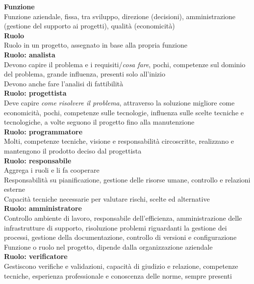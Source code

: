 \documentclass{article}
\begin{document}
		\textbf{Funzione}\\
		Funzione aziendale, fissa, tra sviluppo, direzione (decisioni), amministrazione (gestione del supporto ai progetti), qualità (economicità)\\
		
		\textbf{Ruolo}\\
		Ruolo in un progetto, assegnato in base alla propria funzione\\
		
		\textbf{Ruolo: analista}\\
		Devono capire il problema e i requisiti/\textit{cosa fare}, pochi, competenze sul dominio del problema, grande influenza, presenti solo all'inizio\\
		Devono anche fare l'analisi di fattibilità\\
		
		\textbf{Ruolo: progettista}\\
		Deve capire \textit{come risolvere il problema}, attraverso la soluzione migliore come economicità, pochi, competenze sulle tecnologie, influenza sulle scelte tecniche e tecnologiche, a volte seguono il progetto fino alla manutenzione\\
		
		\textbf{Ruolo: programmatore}\\
		Molti, competenze tecniche, visione e responsabilità circoscritte, realizzano e mantengono il prodotto deciso dal progettista\\
		
		\textbf{Ruolo: responsabile}\\
		Aggrega i ruoli e li fa cooperare\\
		Responsabilità su pianificazione, gestione delle risorse umane, controllo e relazioni esterne\\
		Capacità tecniche necessarie per valutare rischi, scelte ed alternative\\
		
		\textbf{Ruolo: amministratore}\\
		Controllo ambiente di lavoro, responsabile dell'efficienza, amministrazione delle infrastrutture di supporto, risoluzione problemi riguardanti la gestione dei processi, gestione della documentazione, controllo di versioni e configurazione\\
		Funzione o ruolo nel progetto, dipende dalla organizzazione aziendale\\
		
		\textbf{Ruolo: verificatore}\\
		Gestiscono verifiche e validazioni, capacità di giudizio e relazione, competenze tecniche, esperienza professionale e conoscenza delle norme, sempre presenti\\
		
\end{document}
